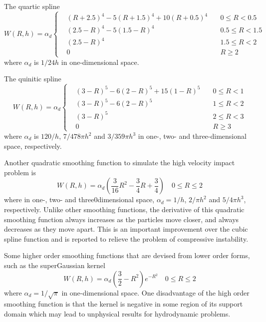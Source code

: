 \documentclass[letterpaper,12pt]{article}
\numberwithin{equation}{section}
\begin{document}
The quartic spline
\begin{equation}
    W(R, h) = \alpha_d
    \left\{
        \begin{aligned}
            & (R+2.5)^4 - 5(R+1.5)^4 + 10(R+0.5)^4 & \quad 0 \leq R < 0.5 \\
            & (2.5-R)^4 - 5(1.5-R)^4 & \quad 0.5 \leq R < 1.5 \\
            & (2.5-R)^4 & \quad 1.5 \leq R < 2 \\
            & 0 & \quad R \geq 2
        \end{aligned}
    \right.
\end{equation}
where $\alpha_d$ is $1/24h$ in one-dimensional space.

The quinitic spline
\begin{equation}
    W(R, h) = \alpha_d
    \left\{
        \begin{aligned}
            & (3-R)^5 - 6(2-R)^5 + 15(1-R)^5 & \quad 0 \leq R < 1 \\
            & (3-R)^5 - 6(2-R)^5 & \quad 1 \leq R < 2 \\
            & (3-R)^5 & \quad 2 \leq R < 3 \\
            & 0 & \quad R \geq 3
        \end{aligned}
    \right.
\end{equation}
where $\alpha_d$ is $120/h$, $7/478\pi h^2$ and $3/359\pi h^3$ in one-, two- and three-dimensional space, respectively.

Another quadratic smoothing function to simulate the high velocity impact problem is
\begin{equation}
    W(R, h) = \alpha_d (\dfrac{3}{16} R^2 - \dfrac34 R + \dfrac34) \quad 0 \leq R \leq 2
\end{equation}
where in one-, two- and three0dimensional space, $\alpha_d = 1/h$, $2/\pi h^2$ and $5/4 \pi h^3$, respectively. Unlike other smoothing functions, the derivative of this quadratic smoothing function always increases as the particles move closer, and always decreases as they move apart. This is an important improvement over the cubic spline function and is reported to relieve the problem of compressive instability.

Some higher order smoothing functions that are devised from lower order forms, such as the superGaussian kernel
\begin{equation}
    W(R, h) = \alpha_d (\dfrac32 - R^2) e^{-R^2} \quad 0 \leq R \leq 2
\end{equation}
where $\alpha_d = 1/\sqrt{\pi}$ in one-dimensional space. One disadvantage of the high order smoothing function is that the kernel is negative in some region of its support domain which may lead to unphysical results for hydrodynamic problems.
\end{document}
